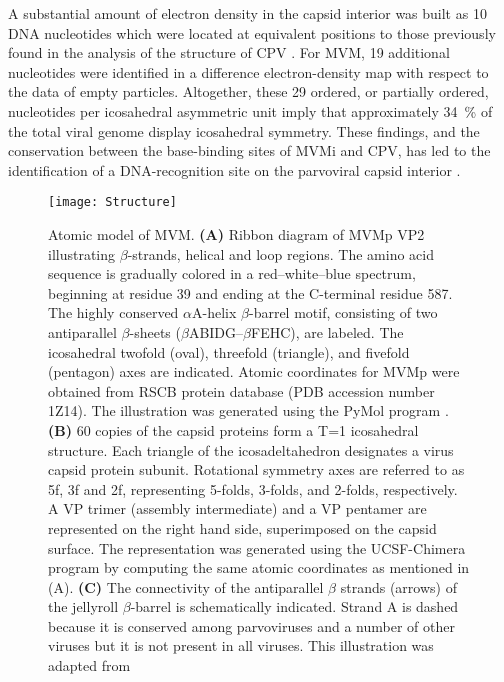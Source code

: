 A substantial amount of electron density in the capsid interior was built as 10 DNA nucleotides which were located at equivalent positions to those previously found in the analysis of the structure of CPV \cite{pmid7735832, pmid1616694}. For MVM, 19 additional nucleotides were identified in a difference electron-density map with respect to the data of empty particles. Altogether, these 29 ordered, or partially ordered, nucleotides per icosahedral asymmetric unit imply that approximately 34~\% of the total viral genome display icosahedral symmetry. These findings, and the conservation between the base-binding sites of MVMi and CPV, has led to the identification of a DNA-recognition site on the parvoviral capsid interior \cite{pmid9817841}.    

\begin{figure}
\centering
  \texttt{[image: Structure]}
  \caption[Structure of MVM]
   {Atomic model of MVM. \textbf{(A)} Ribbon diagram of MVMp VP2 illustrating $\beta$-strands, helical and loop regions. The amino acid sequence is gradually colored in a red–white–blue spectrum, beginning at residue 39 and ending at the C-terminal residue 587. The highly conserved $\alpha$A-helix $\beta$-barrel motif, consisting of two antiparallel $\beta$-sheets ($\beta$ABIDG–$\beta$FEHC), are labeled. The icosahedral twofold (oval), threefold (triangle), and fivefold (pentagon) axes are indicated. Atomic coordinates for MVMp were obtained from RSCB protein database (PDB accession number 1Z14). The illustration was generated using the PyMol program \cite{PyMol}. \textbf{(B)} 60 copies of the capsid proteins form a T=1 icosahedral structure. Each triangle of the icosadeltahedron designates a virus capsid protein subunit. Rotational symmetry axes are referred to as 5f, 3f and 2f, representing 5-folds, 3-folds, and 2-folds, respectively. A VP trimer (assembly intermediate) and a VP pentamer are represented on the right hand side, superimposed on the capsid surface. The representation was generated using the UCSF-Chimera program \cite{pmid15264254} by computing the same atomic coordinates as mentioned in (A). \textbf{(C)} The connectivity of the antiparallel $\beta$ strands (arrows) of the jellyroll $\beta$-barrel is schematically indicated. Strand A is dashed because it is conserved among parvoviruses and a number of other viruses but it is not present in all viruses. This illustration was adapted from \cite{Structure}} 
\label{Structure1}
\end{figure}


